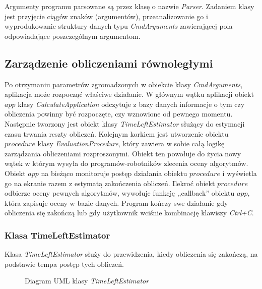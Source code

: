 \documentclass[../thesis.tex]{subfiles}
\begin{document}
Argumenty programu parsowane są przez klasę o nazwie \emph{Parser}. Zadaniem klasy jest przyjęcie ciągów znaków (argumentów), przeanalizowanie go i wyprodukowanie struktury danych typu \emph{CmdArguments} zawierającej pola odpowiadające poszczególnym argumentom.

\subsection{Zarządzenie obliczeniami równoległymi}

Po otrzymaniu parametrów zgromadzonych w obiekcie klasy \emph{CmdArguments}, aplikacja może rozpocząć właściwe działanie. W głównym wątku aplikacji obiekt $app$ klasy \emph{CalculateApplication} odczytuje z bazy danych informacje o tym czy obliczenia powinny być rozpoczęte, czy wznowione od pewnego momentu. Następnie tworzony jest obiekt klasy \emph{TimeLeftEstimator} służący do estymacji czasu trwania reszty obliczeń. Kolejnym korkiem jest utworzenie obiektu $procedure$ klasy \emph{EvaluationProcedure}, który zawiera w sobie całą logikę zarządzania obliczeniami rozproszonymi. Obiekt ten powołuje do życia nowy wątek w którym wysyła do programów-robotników zlecenia oceny algorytmów. Obiekt $app$ na bieżąco monitoruje postęp działania obiektu $procedure$ i wyświetla go na ekranie razem z estymatą zakończenia obliczeń. Ilekroć obiekt $procedure$ odbierze oceny pewnych algorytmów, wywołuje funkcję ,,callback'' obiektu $app$, która zapisuje oceny w  bazie danych. Program kończy swe działanie gdy obliczenia się zakończą lub gdy użytkownik wciśnie kombinację klawiszy \emph{Ctrl+C}. 

\subsubsection{Klasa TimeLeftEstimator}

Klasa \emph{TimeLeftEstimator} służy do przewidzenia, kiedy obliczenia się zakończą, na podstawie tempa postęp tych obliczeń.

\begin{figure}[h]
\centering
{}
\caption{Diagram UML klasy \emph{TimeLeftEstimator}}
\label{proj:diagram_time_left_est}
\end{figure}
\end{document}
